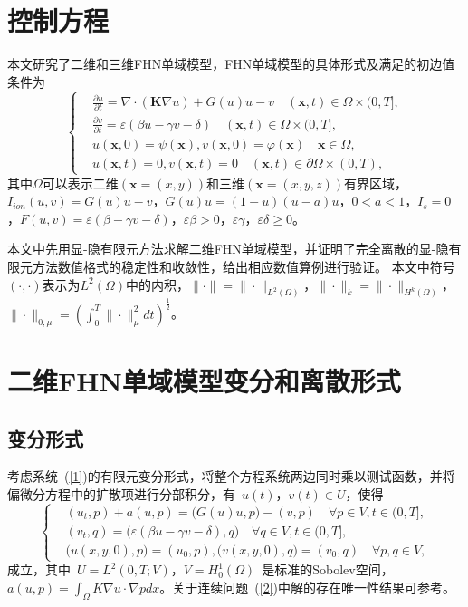 \documentclass[twoside,UTF8]{nputhesis}
\begin{document}
\section{控制方程}
本文研究了二维和三维FHN单域模型，FHN单域模型的具体形式及满足的初边值条件为
\begin{equation}
\left\{\begin{aligned}&\frac{\partial u}{\partial t}=\nabla\cdot(\textbf{K}\nabla u)+G(u)u-v\quad (\textbf{x},t)\in\Omega\times(0,T],\\&\frac{\partial v}{\partial t}=\varepsilon(\beta u-\gamma v-\delta)\quad (\textbf{x},t)\in\Omega\times(0,T],\\&u(\textbf{x},0)=\psi(\textbf{x}),v(\textbf{x},0)=\varphi(\textbf{x})\quad \textbf{x}\in\Omega,
\\&u(\textbf{x},t)=0, v(\textbf{x},t)=0\quad (\textbf{x},t)\in\partial\Omega\times (0,T),
\end{aligned}\right.
\label{1}
\end{equation}
其中$\Omega$可以表示二维$(\textbf{x}=(x,y))$和三维$(\textbf{x}=(x,y,z))$有界区域，$I_{ion}(u,v)=G(u)u-v$，$G(u)u=(1-u)(u-a)u$，$0< a<1$，$I_s=0$，$F(u,v)=\varepsilon(\beta-\gamma v-\delta)$，$\varepsilon\beta>0$，$\varepsilon\gamma$，$\varepsilon\delta\geq0$。

本文中先用显-隐有限元方法求解二维FHN单域模型，并证明了完全离散的显-隐有限元方法数值格式的稳定性和收敛性，给出相应数值算例进行验证。
本文中符号$(\cdot,\cdot)$表示为$L^2(\Omega)$中的内积，$\|\cdot\|=\| \cdot\|_{L^2(\Omega)}$，$\|\cdot\|_k=\| \cdot\|_{H^k(\Omega)}$，$\|\cdot\|_{0,\mu}=(\int^T_0\| \cdot\|^2_\mu dt)^{\frac{1}{2}}$。
\section{二维FHN单域模型变分和离散形式}
\subsection{变分形式}
考虑系统~(\ref{1})的有限元变分形式，将整个方程系统两边同时乘以测试函数，并将偏微分方程中的扩散项进行分部积分，有~$u(t)$，$v(t)\in U$，使得
\begin{equation}
\left\{\begin{aligned}&(u_t,p)+a(u,p)=\big(G(u)u,p\big)-(v,p)\quad \forall p\in V,t\in(0,T],\\&(v_t,q)=\big(\varepsilon(\beta u-\gamma v-\delta),q\big)\quad \forall q\in V,t\in(0,T],\\&\big(u(x,y,0),p\big)=(u_0,p),\big(v(x,y,0),q\big)=(v_0,q)\quad \forall p,q\in V,\end{aligned}\right.
\label{2}
\end{equation}
成立，其中~$U=L^2(0,T;V)$，$V=H^1_0(\Omega)$~是标准的Sobolev空间，$a(u,p)=\int_\Omega K\nabla u\cdot\nabla p dx$。关于连续问题~(\ref{2})中解的存在唯一性结果可参考\cite{exist1978,bianzhi1978}。
\end{document}
